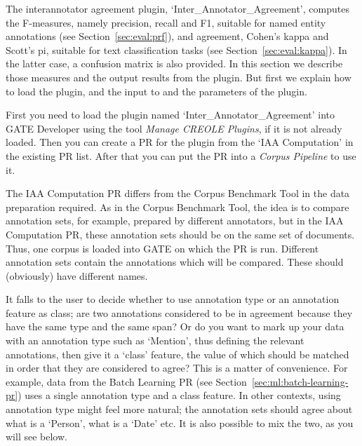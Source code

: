 
The interannotator agreement plugin, `Inter\_Annotator\_Agreement', computes the
F-measures, namely precision, recall and F1, suitable for named entity
annotations (see Section~\ref{sec:eval:prf}), and agreement, Cohen's kappa and
Scott's pi, suitable for text classification tasks (see
Section~\ref{sec:eval:kappa}). In the latter case, a confusion matrix is also
provided. In this section we describe those measures and the output results from
the plugin. But first we explain how to load the plugin, and the input to and the
parameters of the plugin.

First you need to load the plugin named `Inter\_Annotator\_Agreement' into
GATE Developer using the tool {\em Manage CREOLE Plugins}, if it is not
already loaded.  Then you can create a PR for the plugin from the
`IAA Computation' in the existing PR list. After that you can put
the PR into a {\em Corpus Pipeline} to use it.

The IAA Computation PR differs from the Corpus Benchmark Tool in the data
preparation required. As in the Corpus Benchmark Tool, the idea is to compare
annotation sets, for example, prepared by different annotators, but in the IAA
Computation PR, these annotation sets should be on the same set of documents.
Thus, one corpus is loaded into GATE on which the PR is run. Different annotation
sets contain the annotations which will be compared. These should (obviously)
have different names.

It falls to the user to decide whether to use annotation type or an annotation
feature as class; are two annotations considered to be in agreement because they
have the same type and the same span? Or do you want to mark up your data with an
annotation type such as `Mention', thus defining the relevant annotations, then
give it a `class' feature, the value of which should be matched in order that
they are considered to agree? This is a matter of convenience. For example, data
from the Batch Learning PR (see Section~\ref {sec:ml:batch-learning-pr}) uses a
single annotation type and a class feature. In other contexts, using annotation
type might feel more natural; the annotation sets should agree about what is a
`Person', what is a `Date' etc. It is also possible to mix the two, as you will
see below.

